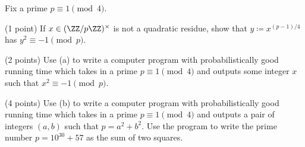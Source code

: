 \documentclass[../notes.tex]{subfiles}
\begin{document}
\begin{prob}[7 points] \label{prob:sum-of-squares}
	Fix a prime $p\equiv1\pmod4$.
	\begin{listalph}
		\item (1 point) If $x\in(\ZZ/p\ZZ)^\times$ is not a quadratic residue, show that $y\coloneqq x^{(p-1)/4}$ has $y^2\equiv-1\pmod p$.
		\item (2 points) Use (a) to write a computer program with probabilistically good running time which takes in a prime $p\equiv1\pmod4$ and outputs some integer $x$ such that $x^2\equiv-1\pmod p$.
		\item (4 points) Use (b) to write a computer program with probabilistically good running time which takes in a prime $p\equiv1\pmod4$ and outputs a pair of integers $(a,b)$ such that $p=a^2+b^2$. Use the program to write the prime number $p=10^{30}+57$ as the sum of two squares.
	\end{listalph}
\end{prob}
\end{document}
